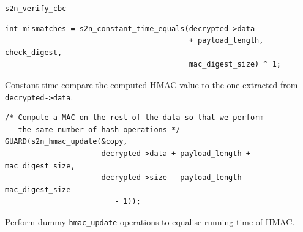 \documentclass[presentation,smaller]{beamer}
\begin{document}
\begin{frame}[fragile,label={sec:orgheadline11}]{\texttt{s2n\_verify\_cbc}}
 \lstset{language=C,label= ,caption= ,captionpos=b,numbers=none}
\begin{lstlisting}
int mismatches = s2n_constant_time_equals(decrypted->data
                                          + payload_length, check_digest,
                                          mac_digest_size) ^ 1;
\end{lstlisting}

\footnotesize Constant-time compare the computed HMAC value to the one extracted from \texttt{decrypted->data}.

\lstset{language=C,label= ,caption= ,captionpos=b,numbers=none}
\begin{lstlisting}
/* Compute a MAC on the rest of the data so that we perform
   the same number of hash operations */
GUARD(s2n_hmac_update(&copy,
                      decrypted->data + payload_length + mac_digest_size,
                      decrypted->size - payload_length - mac_digest_size
                         - 1));
\end{lstlisting}

Perform dummy \texttt{hmac\_update} operations to equalise running time of HMAC.
\end{frame}
\end{document}
